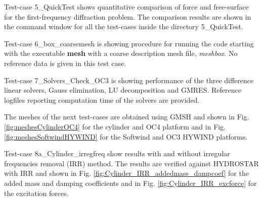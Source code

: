 \documentclass[12pt,a4paper,titlepage]{article}
\begin{document}
Test-case 5\_QuickTest shows quantitative comparison of force and free-surface for the first-frequency diffraction problem. The comparison results are shown in the command window for all the test-cases inside the directory 5\_QuickTest.

Test-case 6\_box\_coarsemesh is showing procedure for running the code starting with the executable \textbf{mesh} with a coarse description mesh file, \textit{meshbox}. No reference data is given in this test case.

Test-case 7\_Solvers\_Check\_OC3 is showing performance of the three difference linear solvers, Gauss elimination, LU decomposition and GMRES. Reference logfiles reporting computation time of the solvers are provided.

The meshes of the next test-cases are obtained using GMSH \cite{gmsh} and shown in Fig. \ref{fig:meshesCylinderOC4} for the cylinder and OC4 platform and in Fig. \ref{fig:meshesSoftwindHYWIND} for the Softwind and OC3 HYWIND platforms.

Test-case 8a\_Cylinder\_irregfreq show results with and without irregular frequencies removal (IRR) method. The results are verified against HYDROSTAR with IRR and shown in Fig. \ref{fig:Cylinder_IRR_addedmass_dampcoef} for the added mass and damping coefficients and in Fig. \ref{fig:Cylinder_IRR_excforce} for the excitation forces.
\end{document}
